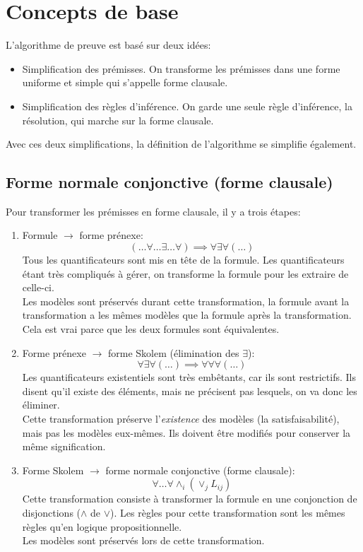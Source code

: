 {\section{Concepts de base}

L'algorithme de preuve est basé sur deux idées:
\begin{itemize}
\item Simplification des prémisses.
On transforme les prémisses dans une forme uniforme et simple qui s'appelle forme clausale.
\item Simplification des règles d'inférence.
On garde une seule règle d'inférence, la résolution, qui marche sur la forme clausale.
\end{itemize}
Avec ces deux simplifications, la définition de l'algorithme se simplifie également.

\subsection{Forme normale conjonctive (forme clausale)} 

Pour transformer les prémisses en forme clausale, il y a trois étapes:
\begin{enumerate}
    \item Formule $\to$ forme prénexe: $$(\ldots{}\forall{}\ldots{}\exists{}\ldots{}\forall{} )\implies \forall{}\exists{}\forall{}(\ldots{})$$
    Tous les quantificateurs sont mis en tête de la formule. Les quantificateurs étant très compliqués à gérer, on transforme la formule pour les extraire de celle-ci. \\
    Les modèles sont préservés durant cette transformation, la formule avant la transformation a les mêmes modèles
    que la formule après la transformation.
    Cela est vrai parce que les deux formules sont équivalentes.
    \item Forme prénexe $\to$ forme Skolem (élimination des $\exists{}$): $$ \forall{}\exists{}\forall{}(\ldots{})  \implies \forall{}\forall{}\forall{}(\ldots{}) $$
    Les quantificateurs existentiels sont très embêtants, car ils sont restrictifs. Ils disent qu'il existe des éléments, mais ne précisent pas lesquels, on va donc les éliminer. \\
    Cette transformation préserve l'{\em existence} des modèles (la satisfaisabilité),
    mais pas les modèles eux-mêmes. Ils doivent être modifiés pour conserver la même signification. 
    \item Forme Skolem $\to$ forme normale conjonctive (forme clausale):  
    \[\forall \ldots \forall \land_i(\lor_j L_{ij})\]
    Cette transformation consiste à transformer la formule en
    une conjonction de disjonctions ($\land$ de $\lor$). Les règles pour cette transformation sont
    les mêmes règles qu'en logique propositionnelle. \\
    Les modèles sont préservés lors de cette transformation. 
\end{enumerate}

}
